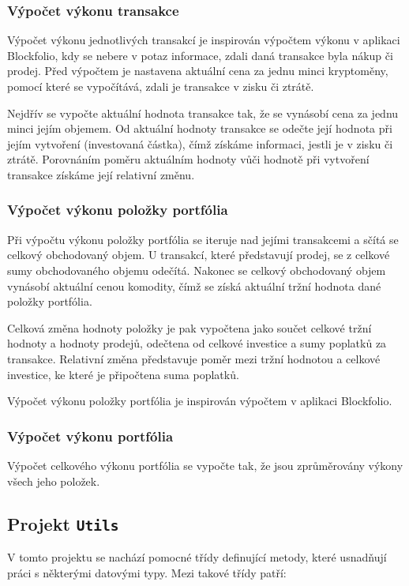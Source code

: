 \documentclass[12pt, a4paper]{article}
\begin{document}
    \subsubsection{Výpočet výkonu transakce}
    Výpočet výkonu jednotlivých transakcí je inspirován výpočtem výkonu v aplikaci Blockfolio, kdy se nebere v potaz informace, zdali daná transakce byla nákup či prodej.
    Před výpočtem je nastavena aktuální cena za jednu minci kryptoměny, pomocí které se vypočítává, zdali je transakce v zisku či ztrátě.
    
    Nejdřív se vypočte aktuální hodnota transakce tak, že se vynásobí cena za jednu minci jejím objemem.
    Od aktuální hodnoty transakce se odečte její hodnota při jejím vytvoření (investovaná částka), čímž získáme informaci, jestli je v zisku či ztrátě.
    Porovnáním poměru aktuálním hodnoty vůči hodnotě při vytvoření transakce získáme její relativní změnu.
    
    \subsubsection{Výpočet výkonu položky portfólia}
    Při výpočtu výkonu položky portfólia se iteruje nad jejími transakcemi a sčítá se celkový obchodovaný objem.
    U transakcí, které představují prodej, se z celkové sumy obchodovaného objemu odečítá.
    Nakonec se celkový obchodovaný objem vynásobí aktuální cenou komodity, čímž se získá aktuální tržní hodnota dané položky portfólia.
    
    Celková změna hodnoty položky je pak vypočtena jako součet celkové tržní hodnoty a hodnoty prodejů, odečtena od celkové investice a sumy poplatků za transakce. 
    Relativní změna představuje poměr mezi tržní hodnotou a celkové investice, ke které je připočtena suma poplatků.
    
    Výpočet výkonu položky portfólia je inspirován výpočtem v aplikaci Blockfolio.
    
    \subsubsection{Výpočet výkonu portfólia}
    Výpočet celkového výkonu portfólia se vypočte tak, že jsou zprůměrovány výkony všech jeho položek.

    \subsection{Projekt \texttt{Utils}}
    V tomto projektu se nachází pomocné třídy definující metody, které usnadňují práci s některými datovými typy. 
    Mezi takové třídy patří:
\end{document}

